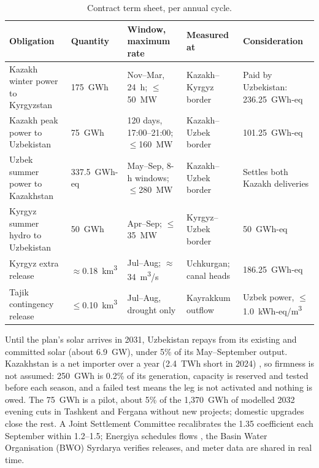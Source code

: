 \documentclass[11pt,letterpaper]{article}
\newcommand{\headrow}{\rowcolor{rowblue}}
\begin{document}
\begin{table}[!t]
\centering\footnotesize
\caption{Contract term sheet, per annual cycle.}\label{tab:terms}
\begin{tabularx}{\textwidth}{@{}L{3.0cm}L{1.5cm}L{2.8cm}L{2.3cm}Y@{}}
\toprule
\headrow Obligation & Quantity & Window, maximum rate & Measured at & Consideration \\
\midrule
Kazakh winter power to Kyrgyzstan & 175~GWh & Nov--Mar, 24~h; $\le$50~MW & Kazakh--Kyrgyz border & Paid by Uzbekistan: 236.25~GWh-eq \\
Kazakh peak power to Uzbekistan & 75~GWh & 120 days, 17:00--21:00; $\le$160~MW & Kazakh--Uzbek border & 101.25~GWh-eq \\
Uzbek summer power to Kazakhstan & 337.5~GWh-eq & May--Sep, 8-h windows; $\le$280~MW & Kazakh--Uzbek border & Settles both Kazakh deliveries \\
Kyrgyz summer hydro to Uzbekistan & 50~GWh & Apr--Sep; $\le$35~MW & Kyrgyz--Uzbek border & 50~GWh-eq \\
Kyrgyz extra release & $\approx$0.18~km\textsuperscript{3} & Jul--Aug; $\approx$34~m\textsuperscript{3}/s & Uchkurgan; canal heads & 186.25~GWh-eq \\
Tajik contingency release & $\le$0.10~km\textsuperscript{3} & Jul--Aug, drought only & Kayrakkum outflow & Uzbek power, $\le$1.0~kWh-eq/m\textsuperscript{3} \\
\bottomrule
\end{tabularx}
\end{table}

Until the plan's solar arrives in 2031, Uzbekistan repays from its existing and committed solar (about 6.9~GW), under 5\% of its May--September output. Kazakhstan is a net importer over a year (2.4~TWh short in 2024) \cite{timesca-kzdeficit}, so firmness is not assumed: 250~GWh is 0.2\% of its generation, capacity is reserved and tested before each season, and a failed test means the leg is not activated and nothing is owed. The 75~GWh is a pilot, about 5\% of the 1,370~GWh of modelled 2032 evening cuts in Tashkent and Fergana without new projects; domestic upgrades close the rest. A Joint Settlement Committee recalibrates the 1.35 coefficient each September within 1.2--1.5; Energiya schedules flows \cite{cdc-energiya}, the Basin Water Organisation (BWO) Syrdarya verifies releases, and meter data are shared in real time.
\end{document}
